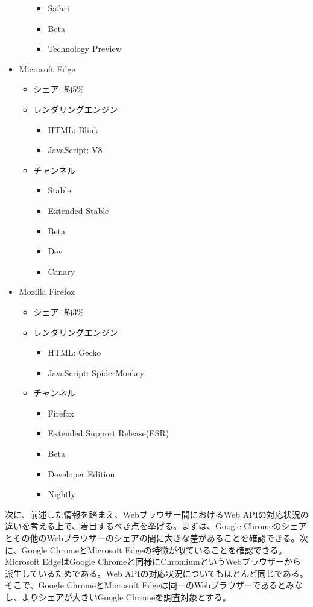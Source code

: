 \begin{itemize}
\begin{itemize}
\begin{itemize}
            \item Safari
            \item Beta
            \item Technology Preview
        \end{itemize}
    \end{itemize}
    \item Microsoft Edge
    \begin{itemize}
        \item シェア: 約5\%
        \item レンダリングエンジン
        \begin{itemize}
            \item HTML: Blink
            \item JavaScript: V8
        \end{itemize}
        \item チャンネル~\cite{MicrosoftEdgeChannels}
        \begin{itemize}
            \item Stable
            \item Extended Stable
            \item Beta
            \item Dev
            \item Canary
        \end{itemize}
    \end{itemize}
    \item Mozilla Firefox
    \begin{itemize}
        \item シェア: 約3\%
        \item レンダリングエンジン
        \begin{itemize}
            \item HTML: Gecko
            \item JavaScript: SpiderMonkey
        \end{itemize}
        \item チャンネル~\cite{MozillaFirefoxChannels}
        \begin{itemize}
            \item Firefox
            \item Extended Support Release(ESR)
            \item Beta
            \item Developer Edition
            \item Nightly
        \end{itemize}
    \end{itemize}
\end{itemize}
次に、前述した情報を踏まえ、Webブラウザー間におけるWeb APIの対応状況の違いを考える上で、着目するべき点を挙げる。まずは、Google Chromeのシェアとその他のWebブラウザーのシェアの間に大きな差があることを確認できる。次に、Google ChromeとMicrosoft Edgeの特徴が似ていることを確認できる。Microsoft EdgeはGoogle Chromeと同様にChromiumというWebブラウザーから派生しているためである。Web APIの対応状況についてもほとんど同じである。そこで、Google ChromeとMicrosoft Edgeは同一のWebブラウザーであるとみなし、よりシェアが大きいGoogle Chromeを調査対象とする。

